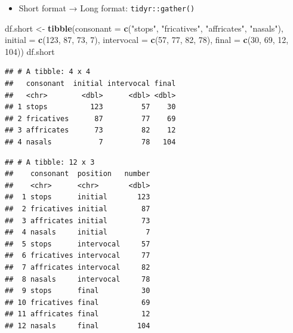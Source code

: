 \documentclass[]{book}
\newenvironment{Shaded}{\begin{snugshade}}{\end{snugshade}}
\newcommand{\DataTypeTok}[1]{\textcolor[rgb]{0.13,0.29,0.53}{#1}}
\newcommand{\DecValTok}[1]{\textcolor[rgb]{0.00,0.00,0.81}{#1}}
\newcommand{\KeywordTok}[1]{\textcolor[rgb]{0.13,0.29,0.53}{\textbf{#1}}}
\newcommand{\NormalTok}[1]{#1}
\newcommand{\OperatorTok}[1]{\textcolor[rgb]{0.81,0.36,0.00}{\textbf{#1}}}
\newcommand{\StringTok}[1]{\textcolor[rgb]{0.31,0.60,0.02}{#1}}
\providecommand{\tightlist}{%
  \setlength{\itemsep}{0pt}\setlength{\parskip}{0pt}}
\begin{document}
\begin{itemize}
\tightlist
\item
  Short format → Long format: \texttt{tidyr::gather()}
\end{itemize}

\begin{Shaded}
\begin{Highlighting}[]
\NormalTok{df.short <-}\StringTok{ }\KeywordTok{tibble}\NormalTok{(}\DataTypeTok{consonant =} \KeywordTok{c}\NormalTok{(}\StringTok{"stops"}\NormalTok{, }\StringTok{"fricatives"}\NormalTok{, }\StringTok{"affricates"}\NormalTok{, }\StringTok{"nasals"}\NormalTok{),}
                   \DataTypeTok{initial =} \KeywordTok{c}\NormalTok{(}\DecValTok{123}\NormalTok{, }\DecValTok{87}\NormalTok{, }\DecValTok{73}\NormalTok{, }\DecValTok{7}\NormalTok{),}
                   \DataTypeTok{intervocal =} \KeywordTok{c}\NormalTok{(}\DecValTok{57}\NormalTok{, }\DecValTok{77}\NormalTok{, }\DecValTok{82}\NormalTok{, }\DecValTok{78}\NormalTok{),}
                   \DataTypeTok{final =} \KeywordTok{c}\NormalTok{(}\DecValTok{30}\NormalTok{, }\DecValTok{69}\NormalTok{, }\DecValTok{12}\NormalTok{, }\DecValTok{104}\NormalTok{))}
\NormalTok{df.short}
\end{Highlighting}
\end{Shaded}

\begin{verbatim}
## # A tibble: 4 x 4
##   consonant  initial intervocal final
##   <chr>        <dbl>      <dbl> <dbl>
## 1 stops          123         57    30
## 2 fricatives      87         77    69
## 3 affricates      73         82    12
## 4 nasals           7         78   104
\end{verbatim}

\begin{Shaded}
\end{Shaded}

\begin{verbatim}
## # A tibble: 12 x 3
##    consonant  position   number
##    <chr>      <chr>       <dbl>
##  1 stops      initial       123
##  2 fricatives initial        87
##  3 affricates initial        73
##  4 nasals     initial         7
##  5 stops      intervocal     57
##  6 fricatives intervocal     77
##  7 affricates intervocal     82
##  8 nasals     intervocal     78
##  9 stops      final          30
## 10 fricatives final          69
## 11 affricates final          12
## 12 nasals     final         104
\end{verbatim}
\end{document}
